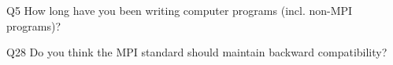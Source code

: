 \begin{description}%
\item{Q5} How long have you been writing computer programs (incl. non-MPI programs)?%
\item{Q28} Do you think the MPI standard should maintain backward compatibility?%
\end{description}%
